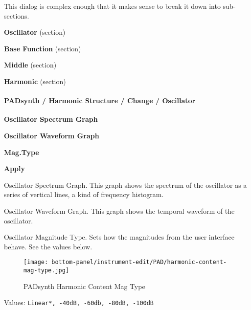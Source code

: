    This dialog is complex enough that it makes sense to break it down into
   sub-sections.

   \begin{enumber}
      \item \textbf{Oscillator} (section)
      \item \textbf{Base Function} (section)
      \item \textbf{Middle} (section)
      \item \textbf{Harmonic} (section)
   \end{enumber}

\paragraph{PADsynth / Harmonic Structure / Change / Oscillator}
\label{paragraph:padsynth_harmonic_structure_change_oscillator}

   \begin{enumber}
      \item \textbf{Oscillator Spectrum Graph}
      \item \textbf{Oscillator Waveform Graph}
      \item \textbf{Mag.Type}
      \item \textbf{Apply}
   \end{enumber}

   \setcounter{ItemCounter}{0}      %

   Oscillator Spectrum Graph.
   This graph shows the spectrum of the oscillator as a series of vertical
   lines, a kind of frequency histogram.

   Oscillator Waveform Graph.
   This graph shows the temporal waveform  of the oscillator.

   Oscillator Magnitude Type.
   Sets how the magnitudes from the user interface behave.  See the values
   below.

\begin{figure}[H]
   \centering
   \texttt{[image: bottom-panel/instrument-edit/PAD/harmonic-content-mag-type.jpg]}
   \caption{PADsynth Harmonic Content Mag Type}
   \label{fig:padsynth_harmonic_content_mag_type}
\end{figure}

   Values: \texttt{Linear*, -40dB, -60db, -80dB, -100dB}

